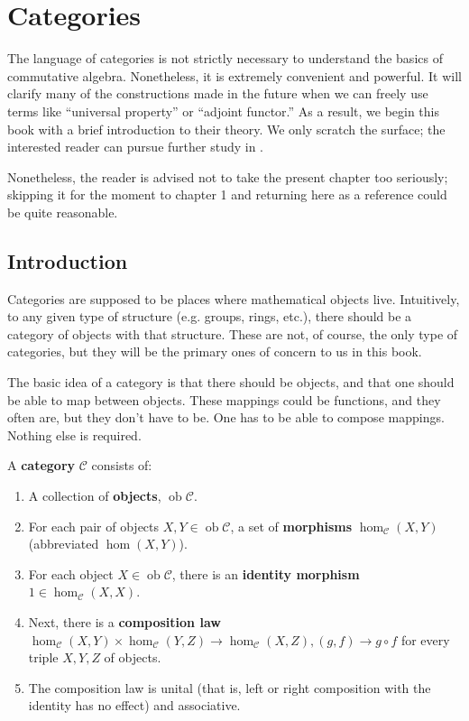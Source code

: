 \setcounter{chapter}{-1}
\chapter{Categories}
\label{categorychapter}


The language of categories is not strictly necessary to understand the basics
of  commutative
algebra. Nonetheless, it is extremely convenient and powerful. It will clarify
many of the constructions made in the future when we can freely use terms like
``universal property'' or ``adjoint functor.'' As a result, we begin this book
with a brief introduction to their theory. We only scratch the surface; the
interested reader can pursue further study in \cite{Ma98}.


Nonetheless, the reader is advised not to take the present chapter too
seriously; skipping it for the moment to chapter 1 and returning here as a
reference could be quite reasonable. 

\section{Introduction}
\newcommand{\ob}{\operatorname{ob}}

Categories are supposed to be places where mathematical objects live.
Intuitively, to any given type of structure (e.g. groups, rings, etc.), there should be a
category of objects with that structure. These are not, of course, the only
type of categories, but they will be the primary ones of concern to us in this
book.


The basic idea of a category is that there should be objects, and that one
should be able to map between objects. These mappings could be functions, and
they often are, but they don't have to be. One has to be able to compose
mappings. Nothing else is required.

\begin{definition} 
A \textbf{category} $\mathcal{C}$ consists of:
\begin{enumerate}
\item  A collection of \textbf{objects},
$\ob \mathcal{C}$.
\item For each pair of objects $X, Y \in
\ob \mathcal{C}$, a set
of \textbf{morphisms} $\hom_{\mathcal{C}}(X, Y)$ (abbreviated $\hom(X,Y)$). 
\item For each object $X \in \ob\mathcal{C}$, there is an \textbf{identity morphism}
$1 \in \hom_{\mathcal{C}}(X, X)$. 
\item Next, there is a \textbf{composition law}
$\hom_{\mathcal{C}}(X, Y) \times \hom_{\mathcal{C}}(Y, Z) \to
\hom_{\mathcal{C}}(X, Z), (g, f) \to g
\circ f$ for every
triple $X, Y, Z$ of objects.
\item  The composition law is unital (that is, left or right composition with
the identity has no effect) and associative. 
\end{enumerate}
\end{definition} 

